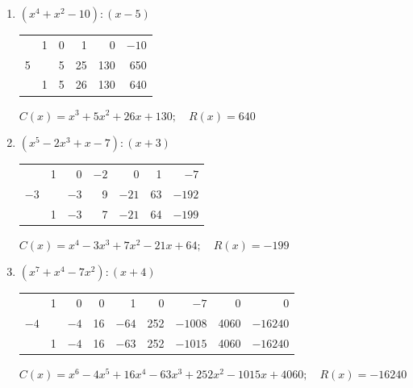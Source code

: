 \documentclass[a4paper,12pt]{article}
\begin{document}
\begin{enumerate}
\begin{enumerate}[label=\textbf{\alph*)}]
            \vspace{0.4cm}

            \item $(x^4 + x^2 - 10) : (x - 5)$
            \begin{center}
            \begin{tabular}{r|rrrrr}
              & 1 & 0 & 1 & 0 & $-10$ \\
            5 &   & 5 & 25 & 130 & 650 \\ \hline
              & 1 & 5 & 26 & 130 & \multicolumn{1}{|r}{640}
            \end{tabular}
            
            \smallskip
            $C(x) = x^3 + 5x^2 + 26x + 130; \quad R(x) = 640$
            \end{center}

            \vspace{0.4cm}

            \item $(x^5 - 2x^3 + x - 7) : (x + 3)$
            \begin{center}
            \begin{tabular}{r|rrrrrr}
              & 1 & 0 & $-2$ & 0 & 1 & $-7$ \\
            $-3$ &   & $-3$ & 9 & $-21$ & 63 & $-192$ \\ \hline
              & 1 & $-3$ & 7 & $-21$ & 64 & \multicolumn{1}{|r}{$-199$}
            \end{tabular}
            
            \smallskip
            $C(x) = x^4 - 3x^3 + 7x^2 - 21x + 64; \quad R(x) = -199$
            \end{center}

            \vspace{0.4cm}

            \item $(x^7 + x^4 - 7x^2) : (x + 4)$
            \begin{center}
            \small
            \begin{tabular}{r|rrrrrrrr}
              & 1 & 0 & 0 & 1 & 0 & $-7$ & 0 & 0 \\
            $-4$ &   & $-4$ & 16 & $-64$ & 252 & $-1008$ & 4060 & $-16240$ \\ \hline
              & 1 & $-4$ & 16 & $-63$ & 252 & $-1015$ & 4060 & \multicolumn{1}{|r}{$-16240$}
            \end{tabular}
            
            \smallskip
            $C(x) = x^6 - 4x^5 + 16x^4 - 63x^3 + 252x^2 - 1015x + 4060; \quad R(x) = -16240$
            \end{center}
        \end{enumerate}


\end{enumerate}
\end{document}
